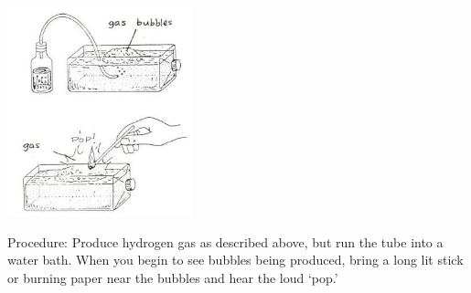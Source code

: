 \begin{multicols}{2}
\begin{center}
\includegraphics[width=0.4\textwidth]{./img/source/hydrogen-bubbles.jpg}
\end{center}

\begin{description*}
\item[Procedure:]{Produce hydrogen gas as described above, but run the tube into a water bath. When you begin to see bubbles being produced, bring a long lit stick or burning paper near the bubbles and hear the loud `pop.'}
\end{description*}



\end{multicols}

\pagebreak